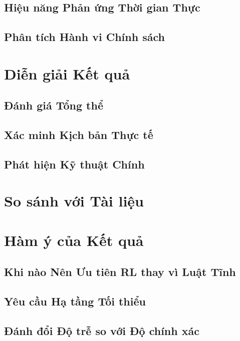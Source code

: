 \documentclass[12pt,a4paper,twoside]{report}
\begin{document}
\subsection{Hiệu năng Phản ứng Thời gian Thực}

\subsection{Phân tích Hành vi Chính sách}

\section{Diễn giải Kết quả}

\subsection{Đánh giá Tổng thể}

\subsection{Xác minh Kịch bản Thực tế}

\subsection{Phát hiện Kỹ thuật Chính}

\section{So sánh với Tài liệu}

\section{Hàm ý của Kết quả}

\subsection{Khi nào Nên Ưu tiên RL thay vì Luật Tĩnh}

\subsection{Yêu cầu Hạ tầng Tối thiểu}

\subsection{Đánh đổi Độ trễ so với Độ chính xác}
\end{document}

